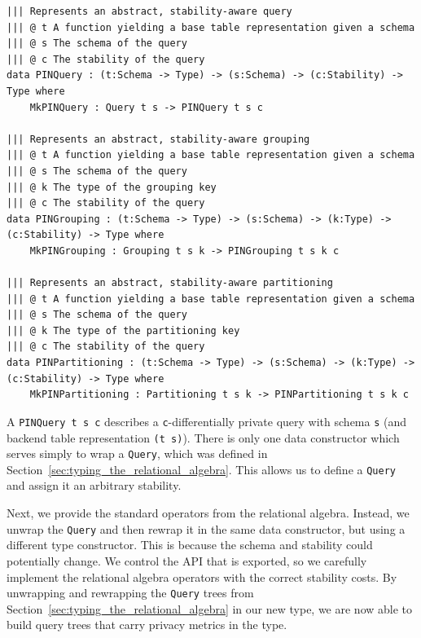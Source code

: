 \documentclass[12pt]{article}
\begin{document}
\begin{lstlisting}
||| Represents an abstract, stability-aware query
||| @ t A function yielding a base table representation given a schema
||| @ s The schema of the query
||| @ c The stability of the query
data PINQuery : (t:Schema -> Type) -> (s:Schema) -> (c:Stability) -> Type where
    MkPINQuery : Query t s -> PINQuery t s c

||| Represents an abstract, stability-aware grouping
||| @ t A function yielding a base table representation given a schema
||| @ s The schema of the query
||| @ k The type of the grouping key
||| @ c The stability of the query
data PINGrouping : (t:Schema -> Type) -> (s:Schema) -> (k:Type) -> (c:Stability) -> Type where
    MkPINGrouping : Grouping t s k -> PINGrouping t s k c

||| Represents an abstract, stability-aware partitioning
||| @ t A function yielding a base table representation given a schema
||| @ s The schema of the query
||| @ k The type of the partitioning key
||| @ c The stability of the query
data PINPartitioning : (t:Schema -> Type) -> (s:Schema) -> (k:Type) -> (c:Stability) -> Type where
    MkPINPartitioning : Partitioning t s k -> PINPartitioning t s k c
\end{lstlisting}

A \texttt{PINQuery t s c} describes a \texttt{c}-differentially private query with schema \texttt{s} (and backend table representation \texttt{(t s)}).
There is only one data constructor which serves simply to wrap a \texttt{Query}, which was defined in Section~\ref{sec:typing_the_relational_algebra}.
This allows us to define a \texttt{Query} and assign it an arbitrary stability.

Next, we provide the standard operators from the relational algebra.
Instead, we unwrap the \texttt{Query} and then rewrap it in the same data constructor, but using a different type constructor.
This is because the schema and stability could potentially change.
We control the API that is exported, so we carefully implement the relational algebra operators with the correct stability costs.
By unwrapping and rewrapping the \texttt{Query} trees from Section~\ref{sec:typing_the_relational_algebra} in our new type, we are now able to build query trees that carry privacy metrics in the type.
\end{document}
